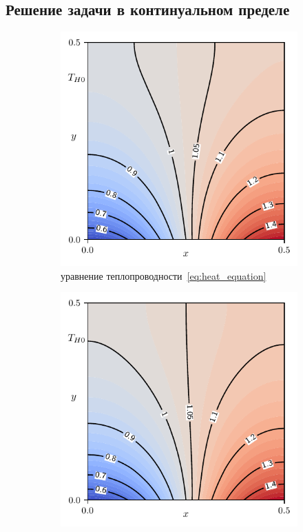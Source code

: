 \documentclass[10pt]{article}
\begin{document}
\subsection{Решение задачи в континуальном пределе}

\begin{figure}
    \centering
    \begin{subfigure}[b]{0.5\linewidth}
        \centering
        \includegraphics{contours/heat-0-temp}
        \caption{уравнение теплопроводности~\eqref{eq:heat_equation}}
        \label{fig:continuum:temp-heat}
    \end{subfigure}%
    \begin{subfigure}[b]{0.5\linewidth}
        \centering
        \includegraphics{contours/asym-0-temp}

\end{subfigure}
\end{figure}
\end{document}

